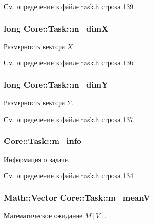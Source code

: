 См. определение в файле task.\+h строка 139

\subsubsection[{\texorpdfstring{m\+\_\+dimX}{m_dimX}}]{\setlength{\rightskip}{0pt plus 5cm}long Core\+::\+Task\+::m\+\_\+dimX\hspace{0.3cm}{\ttfamily [protected]}}\hypertarget{class_core_1_1_task_a3314c516035accea22900aede28ee64b}{}\label{class_core_1_1_task_a3314c516035accea22900aede28ee64b}
Размерность вектора $X$. 

См. определение в файле task.\+h строка 136

\subsubsection[{\texorpdfstring{m\+\_\+dimY}{m_dimY}}]{\setlength{\rightskip}{0pt plus 5cm}long Core\+::\+Task\+::m\+\_\+dimY\hspace{0.3cm}{\ttfamily [protected]}}\hypertarget{class_core_1_1_task_aa317bebd7f5dbfa5dc86463cb0377b12}{}\label{class_core_1_1_task_aa317bebd7f5dbfa5dc86463cb0377b12}
Размерность вектора $Y$. 

См. определение в файле task.\+h строка 137

\subsubsection[{\texorpdfstring{m\+\_\+info}{m_info}}]{ Core\+::\+Task\+::m\+\_\+info\hspace{0.3cm}{\ttfamily [protected]}}\hypertarget{class_core_1_1_task_a259973874ba0b34cd7faccfd35dd683f}{}\label{class_core_1_1_task_a259973874ba0b34cd7faccfd35dd683f}
Информация о задаче. 

См. определение в файле task.\+h строка 134

\subsubsection[{\texorpdfstring{m\+\_\+meanV}{m_meanV}}]{\setlength{\rightskip}{0pt plus 5cm}Math\+::\+Vector Core\+::\+Task\+::m\+\_\+meanV\hspace{0.3cm}{\ttfamily [protected]}}\hypertarget{class_core_1_1_task_a420e36c620e30cd0f55689ce481c1391}{}\label{class_core_1_1_task_a420e36c620e30cd0f55689ce481c1391}
Математическое ожидание $M[V]$. 

